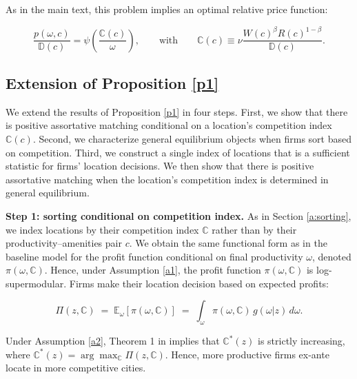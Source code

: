 As in the main text, this problem implies an optimal relative price function:

\begin{equation}\label{eq:newc}
    \frac{p(\omega,c)}{\mathbb{D}(c)} = \psi\left(\frac{\mathbb{C}(c)}{\omega} \right), \qquad \text{with} \qquad \mathbb{C}(c) \equiv \nu \frac{W(c)^\beta R(c)^{1-\beta}}{\mathbb{D}(c)}.
\end{equation}

\subsection{Extension of Proposition \ref{p1}}
We extend the results of Proposition \ref{p1} in four steps. First, we show that there is positive assortative matching conditional on a location’s competition index $\mathbb{C}(c)$. Second, we characterize general equilibrium objects when firms sort based on competition. Third, we construct a single index of locations that is a sufficient statistic for firms’ location decisions. We then show that there is positive assortative matching when the location’s competition index is determined in general equilibrium.

\noindent \textbf{Step 1: sorting conditional on competition index.} As in Section \ref{a:sorting}, we index locations by their competition index $\mathbb{C}$ rather than by their productivity–amenities pair $c$. We obtain the same functional form as in the baseline model for the profit function conditional on final productivity $\omega$, denoted $\pi(\omega,\mathbb{C})$. Hence, under Assumption \ref{a1}, the profit function $\pi(\omega,\mathbb{C})$ is log-supermodular. Firms make their location decision based on expected profits:

\begin{equation*}
    \Pi(z,\mathbb{C}) \;=\; \mathbb{E}_\omega\!\left[\pi(\omega,\mathbb{C})\right]
    \;=\; \int_\omega \pi(\omega,\mathbb{C})\, g(\omega | z)\, d\omega .
\end{equation*}

Under Assumption \ref{a2}, Theorem 1 in \textcite{Athey02} implies that $\mathbb{C}^*(z)$ is strictly increasing, where $\mathbb{C}^*(z) = \arg\max_{\mathbb{C}} \Pi(z,\mathbb{C})$. Hence, more productive firms ex-ante locate in more competitive cities.

